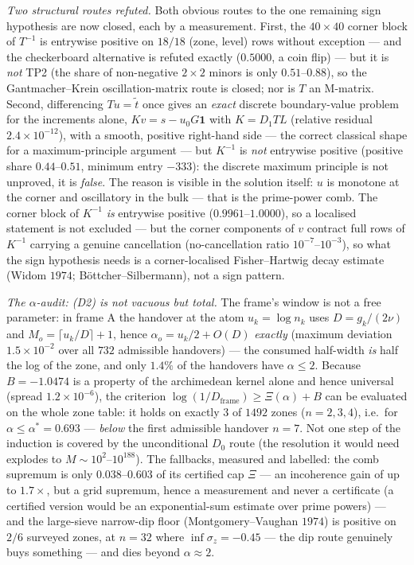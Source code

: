 \documentclass[11pt,a4paper]{article}
\begin{document}
\emph{Two structural routes refuted.} Both obvious routes to the one remaining sign hypothesis
are now closed, each by a measurement. First, the $40\times40$ corner block of $T^{-1}$ is
entrywise positive on $18/18$ (zone, level) rows without exception --- and the checkerboard
alternative is refuted exactly ($0.5000$, a coin flip) --- but it is \emph{not} TP2 (the
share of non-negative $2\times2$ minors is only $0.51$--$0.88$), so the Gantmacher--Krein
oscillation-matrix route is closed; nor is $T$ an M-matrix. Second, differencing $Tu=\tilde t$
once gives an \emph{exact} discrete boundary-value problem for the increments alone,
$Kv=s-u_0G\mathbf 1$ with $K=D_1TL$ (relative residual $2.4\times10^{-12}$), with a smooth,
positive right-hand side --- the correct classical shape for a maximum-principle argument ---
but $K^{-1}$ is \emph{not} entrywise positive (positive share $0.44$--$0.51$, minimum entry
$-333$): the discrete maximum principle is not unproved, it is \emph{false}. The reason is
visible in the solution itself: $u$ is monotone at the corner and oscillatory in the bulk ---
that is the prime-power comb. The corner block of $K^{-1}$ \emph{is} entrywise positive
($0.9961$--$1.0000$), so a localised statement is not excluded --- but the corner components
of $v$ contract full rows of $K^{-1}$ carrying a genuine cancellation (no-cancellation ratio
$10^{-7}$--$10^{-3}$), so what the sign hypothesis needs is a corner-localised
Fisher--Hartwig decay estimate (Widom $1974$; B\"ottcher--Silbermann), not a sign pattern.

\emph{The $\alpha$-audit: (D2) is not vacuous but total.} The frame's window is not a free
parameter: in frame A the handover at the atom $u_k=\log n_k$ uses $D=g_k/(2\nu)$ and
$M_o=\lceil u_k/D\rceil+1$, hence $\alpha_o=u_k/2+O(D)$ \emph{exactly} (maximum deviation
$1.5\times10^{-2}$ over all $732$ admissible handovers) --- the consumed half-width \emph{is}
half the log of the zone, and only $1.4\%$ of the handovers have $\alpha\le2$. Because
$B=-1.0474$ is a property of the archimedean kernel alone and hence universal (spread
$1.2\times10^{-6}$), the criterion $\log(1/D_{\mathrm{frame}})\ge\Xi(\alpha)+B$ can be
evaluated on the whole zone table: it holds on exactly $3$ of $1492$ zones ($n=2,3,4$), i.e.\
for $\alpha\le\alpha^*=0.693$ --- \emph{below} the first admissible handover $n=7$. Not one
step of the induction is covered by the unconditional $D_0$ route (the resolution it would
need explodes to $M\sim10^{2}$--$10^{188}$). The fallbacks, measured and labelled: the comb
supremum is only $0.038$--$0.603$ of its certified cap $\Xi$ --- an incoherence gain of up to
$1.7\times$, but a grid supremum, hence a measurement and never a certificate (a certified
version would be an exponential-sum estimate over prime powers) --- and the large-sieve
narrow-dip floor (Montgomery--Vaughan $1974$) is positive on $2/6$ surveyed zones, at $n=32$
where $\inf\sigma_z=-0.45$ --- the dip route genuinely buys something --- and dies beyond
$\alpha\approx2$.
\end{document}
